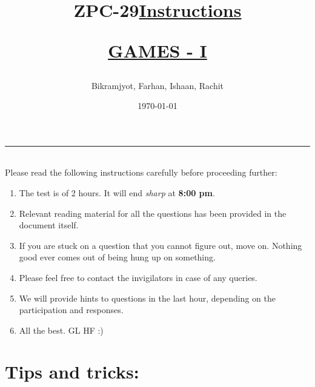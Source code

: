 \documentclass[12pt]{exam}
\title{ZPC-29}
\author{Bikramjyot, Farhan, Ishaan, Rachit}
\date{\today}
\begin{document}
\maketitle
\rule{\textwidth}{1pt}
\printanswers

\title{\textbf{\underline{\fontsize{18}{12}\selectfont Instructions}}}\\
Please read the following instructions carefully before proceeding further:\\
\begin{enumerate}
\item The test is of 2 hours. It will end \textit{sharp} at \textbf{8:00 pm}.
\item Relevant reading material for all the questions has been provided in the document itself.
\item If you are stuck on a question that you cannot figure out, move on. Nothing good ever comes out of being hung up on something.
\item Please feel free to contact the invigilators in case of any queries.
\item We will provide hints to questions in the last hour, depending on the participation and responses.
\item All the best. GL HF :)\\
\end{enumerate}
\bigskip
\maketitle
\newpage
\title{\begin{center}\textbf{\underline{\fontsize{16}{12}\selectfont GAMES - I}}\end{center}}
\section{Tips and tricks:}
\end{document}
